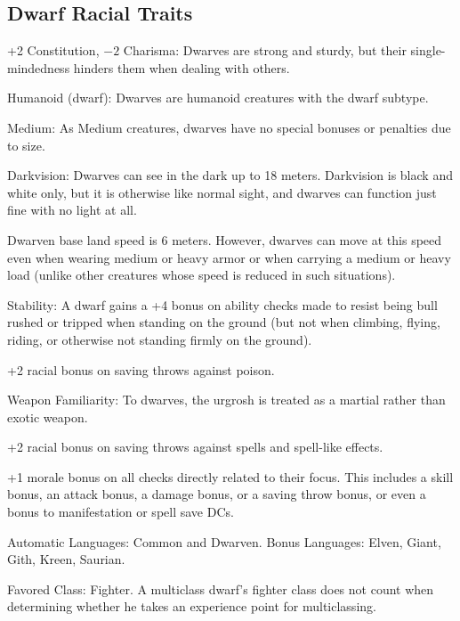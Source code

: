 \subsection{Dwarf Racial Traits}
\begin{itemize*}
    \item +2 Constitution, $-2$ Charisma: Dwarves are strong and sturdy, but their single-mindedness hinders them when dealing with others.
    \item Humanoid (dwarf): Dwarves are humanoid creatures with the dwarf subtype.
    \item Medium: As Medium creatures, dwarves have no special bonuses or penalties due to size.
    \item Darkvision: Dwarves can see in the dark up to 18 meters. Darkvision is black and white only, but it is otherwise like normal sight, and dwarves can function just fine with no light at all.
    \item Dwarven base land speed is 6 meters. However, dwarves can move at this speed even when wearing medium or heavy armor or when carrying a medium or heavy load (unlike other creatures whose speed is reduced in such situations).
    \item Stability: A dwarf gains a +4 bonus on ability checks made to resist being bull rushed or tripped when standing on the ground (but not when climbing, flying, riding, or otherwise not standing firmly on the ground).
    \item +2 racial bonus on saving throws against poison.
    \item Weapon Familiarity: To dwarves, the urgrosh is treated as a martial rather than exotic weapon.
    \item +2 racial bonus on saving throws against spells and spell-like effects.
    \item +1 morale bonus on all checks directly related to their focus. This includes a skill bonus, an attack bonus, a damage bonus, or a saving throw bonus, or even a bonus to manifestation or spell save DCs.
    \item Automatic Languages: Common and Dwarven. Bonus Languages: Elven, Giant, Gith, Kreen, Saurian.
    \item Favored Class: Fighter. A multiclass dwarf's fighter class does not count when determining whether he takes an experience point for multiclassing.
\end{itemize*}